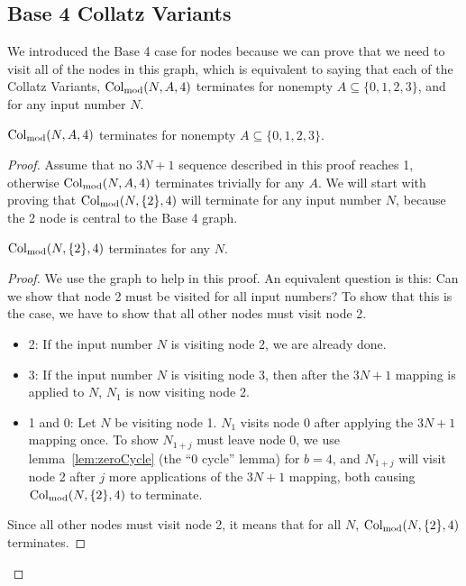 \subsection{Base 4 Collatz Variants} \label{subsubsec:base4variants}
We introduced the Base 4 case for nodes because we can prove that we need to visit all of the nodes in this graph, which is equivalent to saying that each of the Collatz Variants, $\mathrm{Col}_{\text{mod}}(N,A,4)$ terminates for nonempty $A \subseteq \{0,1,2,3\}$, and for any input number $N$. 
\begin{theorem}
$\mathrm{Col}_{\text{mod}}(N,A,4)$ terminates for nonempty $A \subseteq \{0,1,2,3\}$.
\end{theorem}
\begin{proof}
Assume that no $3N+1$ sequence described in this proof reaches 1, otherwise $\mathrm{Col}_{\text{mod}}(N,A,4)$ terminates trivially for any $A$. We will start with proving that $\mathrm{Col}_{\text{mod}}(N,\{2\},4)$ will terminate for any input number $N$, because the 2 node is central to the Base 4 graph.  \par
\begin{lemma}
\label{lem:collatzSubTwoModFour}
$\mathrm{Col}_{\text{mod}}(N,\{2\},4)$ terminates for any $N$.
\end{lemma} 
\begin{proof}
We use the graph to help in this proof. An equivalent question is this: Can we show that node 2 must be visited for all input numbers? To show that this is the case, we have to show that all other nodes must visit node 2.
\begin{itemize}
    \item 2: If the input number $N$ is visiting node 2, we are already done.
    \item 3: If the input number $N$ is visiting node 3, then after the $3N+1$ mapping is applied to $N$, $N_1$ is now visiting node 2.
    \item 1 and 0: Let $N$ be visiting node 1. $N_1$ visits node 0 after applying the $3N+1$ mapping once. To show $N_{1+j}$ must leave node 0, we use lemma~\ref{lem:zeroCycle} (the ``0 cycle'' lemma) for $b = 4$, and $N_{1+j}$ will visit node 2 after $j$ more applications of the $3N+1$ mapping, both causing $\mathrm{Col}_{\text{mod}}(N,\{2\},4)$ to terminate.
\end{itemize}
Since all other nodes must visit node 2, it means that for all $N$, $\mathrm{Col}_{\text{mod}}(N,\{2\},4)$ terminates.
\end{proof} \par


\end{proof}
